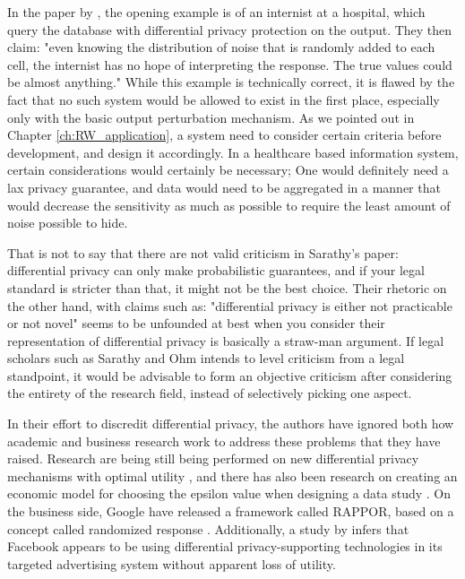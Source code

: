In the paper by \cite{Sarathy2011evaluating}, the opening example is of an internist at a hospital, which query the database with differential privacy protection on the output. They then claim: "even knowing the distribution of noise that is randomly added to each cell, the internist has no hope of interpreting the response. The true values could be almost anything." While this example is technically correct, it is flawed by the fact that no such system would be allowed to exist in the first place, especially only with the basic output perturbation mechanism. As we pointed out in Chapter \ref{ch:RW_application}, a system need to consider certain criteria before development, and design it accordingly. In a healthcare based information system, certain considerations would certainly be necessary; One would definitely need a lax privacy guarantee, and data would need to be aggregated in a manner that would decrease the sensitivity as much as possible to require the least amount of noise possible to hide.

That is not to say that there are not valid criticism in Sarathy's paper: differential privacy can only make probabilistic guarantees, and if your legal standard is stricter than that, it might not be the best choice. Their rhetoric on the other hand, with claims such as: "differential privacy is either not practicable or not novel" seems to be unfounded at best when you consider their representation of differential privacy is basically a straw-man argument. If legal scholars such as Sarathy and Ohm intends to level criticism from a legal standpoint, it would be advisable to form an objective criticism after considering the entirety of the research field, instead of  selectively picking one aspect.

In their effort to discredit differential privacy, the authors have ignored both how academic and business research work to address these problems that they have raised. Research are being still being performed on new differential privacy mechanisms with optimal utility \citep{eigner2014privada}, and there has also been research on creating an economic model for choosing the epsilon value when designing a data study \citep{hsu2014economicEpsilon}. On the business side, Google have released a framework called RAPPOR, based on a concept called randomized response \citep{erlingsson2014rappor}. Additionally, a study by \cite{chin2012differential} infers that Facebook appears to be using differential privacy-supporting technologies in its targeted advertising system without apparent loss of utility.

